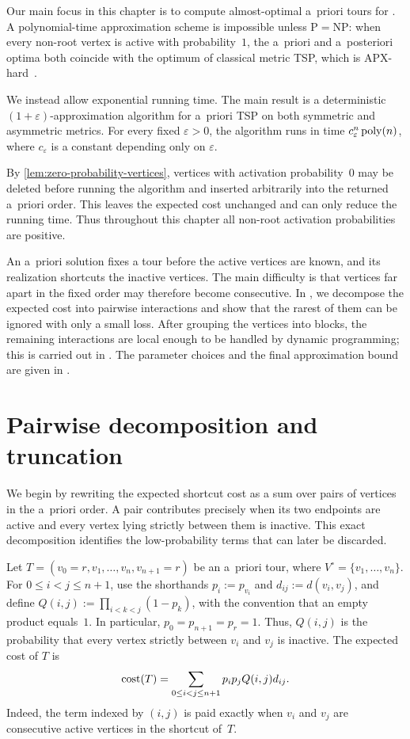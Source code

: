 \documentclass[12pt,a4paper,oneside]{report}
\begin{document}
Our main focus in this chapter is to compute almost-optimal a~priori tours for
\StochTSP{}.  A polynomial-time approximation scheme is impossible unless
$\mathrm{P}=\mathrm{NP}$: when every non-root vertex is active with
probability~$1$, the a~priori and a~posteriori optima both coincide with the
optimum of classical metric TSP, which is APX-hard~\cite{Karpinski2015}.

We instead allow exponential running time.  The main result is a deterministic
$(1+\varepsilon)$-approximation algorithm for a~priori TSP on both symmetric
and asymmetric metrics.  For every fixed $\varepsilon>0$, the algorithm runs
in time $c_\varepsilon^n\operatorname{poly}(n)$, where $c_\varepsilon$ is a constant depending
only on $\varepsilon$.

By \cref{lem:zero-probability-vertices}, vertices with activation
probability~$0$ may be deleted before running the algorithm and inserted
arbitrarily into the returned a~priori order. This leaves the expected cost
unchanged and can only reduce the running time. Thus throughout this chapter
all non-root activation probabilities are positive.

An a~priori solution fixes a tour before the active vertices are known, and
its realization shortcuts the inactive vertices.  The main difficulty is
that vertices far apart in the fixed order may therefore become consecutive.
In , we
decompose the expected cost into pairwise interactions and show that the
rarest of them can be ignored with only a small loss.  After grouping the
vertices into blocks, the remaining interactions are local enough to be
handled by dynamic programming; this is carried out in
.  The parameter choices and
the final approximation bound are given in .

\section{Pairwise decomposition and truncation}
\label{sec:dp-pairwise-objective}
\label{sec:dp-truncation}

We begin by rewriting the expected shortcut cost as a sum over pairs of
vertices in the a~priori order.  A pair contributes precisely when its two
endpoints are active and every vertex lying strictly between them is inactive.  This exact
decomposition identifies the low-probability terms that can later be
discarded.

Let $T=(v_0=r,v_1,\dots,v_n,v_{n+1}=r)$ be an a~priori tour,
where $V^\circ=\{v_1,\dots,v_n\}$.  For $0\le i<j\le n+1$, use the
shorthands $p_i:=p_{v_i}$ and $d_{ij}:=d(v_i,v_j)$, and define
$Q(i,j):=\prod_{i<k<j}(1-p_k)$, with the convention that an empty product
equals~$1$.  In particular, $p_0=p_{n+1}=p_r=1$.
Thus, $Q(i,j)$ is the probability that every vertex strictly between $v_i$ and
$v_j$ is inactive.  The expected cost of $T$ is
\begin{equation}\label{eq:apriori-pairwise}
    \operatorname{cost}(T)
    =
    \sum_{0\le i<j\le n+1}p_i p_j Q(i,j)d_{ij}.
\end{equation}
Indeed, the term indexed by $(i,j)$ is paid exactly when $v_i$ and $v_j$ are
consecutive active vertices in the shortcut of~$T$.
\end{document}

